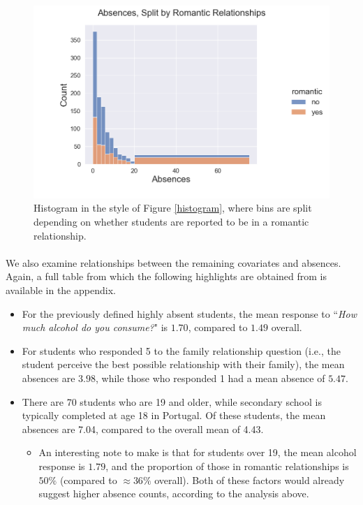 \documentclass[12pt, titlepage]{article}
\begin{document}
	\begin{figure}[h!]
		\centering
		\includegraphics[width = \textwidth]{fig/Hist_Split.png}
		\caption{Histogram in the style of Figure \ref{histogram}, where bins are split depending on whether students are reported to be in a romantic relationship.}
		\label{splithistogram}
	\end{figure}
	
	\paragraph{} We also examine relationships between the remaining covariates and absences. Again, a full table from which the following highlights are obtained from is available in the appendix. 
	
	\begin{itemize}
		\item For the previously defined highly absent students, the mean response to ``\textit{How much alcohol do you consume?}" is $1.70$, compared to $1.49$ overall. 
		\item For students who responded 5 to the family relationship question (i.e., the student perceive the best possible relationship with their family), the mean absences are $3.98$, while those who responded 1 had a mean absence of $5.47$. 
		\item There are 70 students who are 19 and older, while secondary school is typically completed at age 18 in Portugal. Of these students, the mean absences are 7.04, compared to the overall mean of 4.43. 
		\begin{itemize}
			\item An interesting note to make is that for students over 19, the mean alcohol response is $1.79$, and the proportion of those in romantic relationships is $50\%$ (compared to $\approx 36\%$ overall). Both of these factors would already suggest higher absence counts, according to the analysis above. 
		\end{itemize}
	\end{itemize}
	
\end{document}
